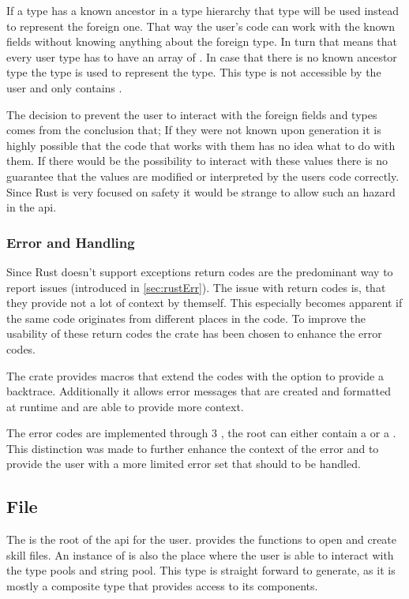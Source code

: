 \documentclass[thesis]{subfiles}
\begin{document}
      If a type has a known ancestor in a type hierarchy that type will be used instead to represent the foreign one.
      That way the user's code can work with the known fields without knowing anything about the foreign type.
      In turn that means that every user type has to have an array of \ForeignFieldData.
      In case that there is no known ancestor type the \Foreign type is used to represent the type.
      This type is not accessible by the user and only contains \ForeignFieldData.

      The decision to prevent the user to interact with the foreign fields and types comes from the conclusion that;
      If they were not known upon generation it is highly possible that the code that works with them has no idea what to do with them.
      If there would be the possibility to interact with these values there is no guarantee that the values are modified or interpreted by the users code correctly.
      Since Rust is very focused on safety it would be strange to allow such an hazard in the \gls{api}.

    \subsubsection{Error and Handling}
      Since Rust doesn't support exceptions return codes are the predominant way to report issues (introduced in \autoref{sec:rustErr}).
      The issue with return codes is, that they provide not a lot of context by themself.
      This especially becomes apparent if the same code originates from different places in the code.
      To improve the usability of these return codes the  crate\autocite{rust-failure} has been chosen to enhance the error codes.

      The crate provides macros that extend the codes with the option to provide a backtrace.
      Additionally it allows error messages that are created and formatted at runtime and are able to provide more context.

      The error codes are implemented through 3 \enums, the root \enum can either contain a  or a .
      This distinction was made to further enhance the context of the error and to provide the user with a more limited error set that should to be handled.

  \subsection{ File}
    The \SkillFile is the root of the \gls{api} for the user.
    \SkillFile provides the functions to open and create \gls{skill} files.
    An instance of \SkillFile is also the place where the user is able to interact with the type pools and string pool.
    This type is straight forward to generate, as it is mostly a composite type that provides access to its components.
\end{document}
